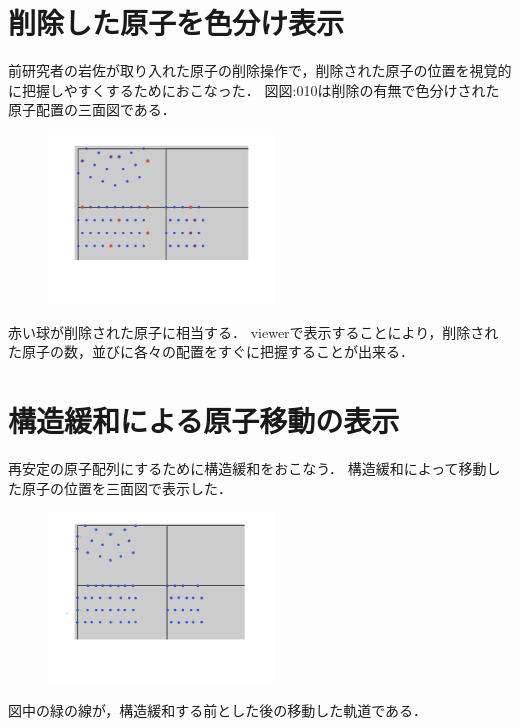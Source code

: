 
\section{削除した原子を色分け表示}
前研究者の岩佐が取り入れた原子の削除操作で，削除された原子の位置を視覚的に把握しやすくするためにおこなった．
図{図:010}は削除の有無で色分けされた原子配置の三面図である．

\begin{figure}[htbp]\begin{center}
\includegraphics[width=6cm,bb=0 0 442 500]{../figs/./boundary_narita.010.jpg}
\caption{}
\label{default}\end{center}\end{figure}
赤い球が削除された原子に相当する．
viewerで表示することにより，削除された原子の数，並びに各々の配置をすぐに把握することが出来る．

\section{構造緩和による原子移動の表示}
再安定の原子配列にするために構造緩和をおこなう．
構造緩和によって移動した原子の位置を三面図で表示した．

\begin{figure}[htbp]\begin{center}
\includegraphics[width=6cm,bb=0 0 442 500]{../figs/./boundary_narita.011.jpg}
\caption{}
\label{default}\end{center}\end{figure}
図中の緑の線が，構造緩和する前とした後の移動した軌道である．

